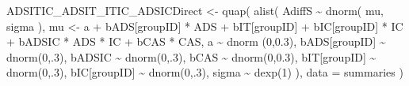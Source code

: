 \documentclass[
  10pt,
  dvipsnames,enabledeprecatedfontcommands]{scrartcl}
\newenvironment{Shaded}{\begin{snugshade}}{\end{snugshade}}
\newcommand{\AttributeTok}[1]{\textcolor[rgb]{0.77,0.63,0.00}{#1}}
\newcommand{\DecValTok}[1]{\textcolor[rgb]{0.00,0.00,0.81}{#1}}
\newcommand{\FloatTok}[1]{\textcolor[rgb]{0.00,0.00,0.81}{#1}}
\newcommand{\FunctionTok}[1]{\textcolor[rgb]{0.00,0.00,0.00}{#1}}
\newcommand{\NormalTok}[1]{#1}
\newcommand{\OtherTok}[1]{\textcolor[rgb]{0.56,0.35,0.01}{#1}}
\newcommand{\SpecialCharTok}[1]{\textcolor[rgb]{0.00,0.00,0.00}{#1}}
\begin{document}
\begin{Shaded}
\begin{Highlighting}[]
\NormalTok{ADSITIC\_ADSIT\_ITIC\_ADSICDirect }\OtherTok{\textless{}{-}} \FunctionTok{quap}\NormalTok{(}
  \FunctionTok{alist}\NormalTok{(}
\NormalTok{    AdiffS }\SpecialCharTok{\textasciitilde{}} \FunctionTok{dnorm}\NormalTok{( mu, sigma ),}
\NormalTok{    mu }\OtherTok{\textless{}{-}}\NormalTok{ a }\SpecialCharTok{+}\NormalTok{ bADS[groupID] }\SpecialCharTok{*}\NormalTok{ ADS }\SpecialCharTok{+}\NormalTok{  bIT[groupID] }\SpecialCharTok{+}\NormalTok{ bIC[groupID] }\SpecialCharTok{*}\NormalTok{ IC }\SpecialCharTok{+}
\NormalTok{      bADSIC }\SpecialCharTok{*}\NormalTok{ ADS }\SpecialCharTok{*}\NormalTok{ IC }\SpecialCharTok{+}\NormalTok{ bCAS }\SpecialCharTok{*}\NormalTok{ CAS,}
\NormalTok{    a }\SpecialCharTok{\textasciitilde{}} \FunctionTok{dnorm}\NormalTok{ (}\DecValTok{0}\NormalTok{,}\FloatTok{0.3}\NormalTok{),}
\NormalTok{    bADS[groupID] }\SpecialCharTok{\textasciitilde{}} \FunctionTok{dnorm}\NormalTok{(}\DecValTok{0}\NormalTok{,.}\DecValTok{3}\NormalTok{),}
\NormalTok{    bADSIC }\SpecialCharTok{\textasciitilde{}} \FunctionTok{dnorm}\NormalTok{(}\DecValTok{0}\NormalTok{,.}\DecValTok{3}\NormalTok{),}
\NormalTok{    bCAS }\SpecialCharTok{\textasciitilde{}} \FunctionTok{dnorm}\NormalTok{(}\DecValTok{0}\NormalTok{,}\FloatTok{0.3}\NormalTok{),}
\NormalTok{    bIT[groupID] }\SpecialCharTok{\textasciitilde{}} \FunctionTok{dnorm}\NormalTok{(}\DecValTok{0}\NormalTok{,.}\DecValTok{3}\NormalTok{),}
\NormalTok{    bIC[groupID] }\SpecialCharTok{\textasciitilde{}} \FunctionTok{dnorm}\NormalTok{(}\DecValTok{0}\NormalTok{,.}\DecValTok{3}\NormalTok{),}
\NormalTok{    sigma  }\SpecialCharTok{\textasciitilde{}} \FunctionTok{dexp}\NormalTok{(}\DecValTok{1}\NormalTok{)}
\NormalTok{  ), }
  \AttributeTok{data =}\NormalTok{ summaries}
\NormalTok{)}



\end{Highlighting}
\end{Shaded}
\end{document}
